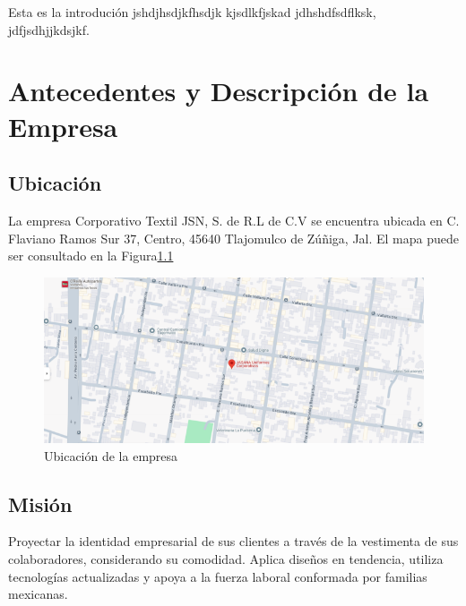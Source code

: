 \documentclass[12pt,letterpaper,spanish]{report}
\begin{document}
Esta es la introdución jshdjhsdjkfhsdjk kjsdlkfjskad jdhshdfsdflksk, jdfjsdhjjkdsjkf.



\chapter{Antecedentes y Descripción de la Empresa}
\newpage




\section{Ubicación}
La empresa Corporativo Textil JSN, S. de R.L de C.V se encuentra ubicada en C. Flaviano Ramos Sur 37, Centro, 45640 Tlajomulco de Zúñiga, Jal. El mapa puede ser consultado en la Figura\ref{a1}

\begin{figure}[htp]
  \centering
  \includegraphics*{mapajasana1.png}
  \caption{Ubicación de la empresa}\label{a1}
\end{figure}




\section{Misión}
Proyectar la identidad empresarial de sus clientes a través de la vestimenta de sus colaboradores, considerando su comodidad. Aplica diseños en tendencia, utiliza tecnologías actualizadas y apoya a la fuerza laboral conformada por familias mexicanas.
\end{document}
